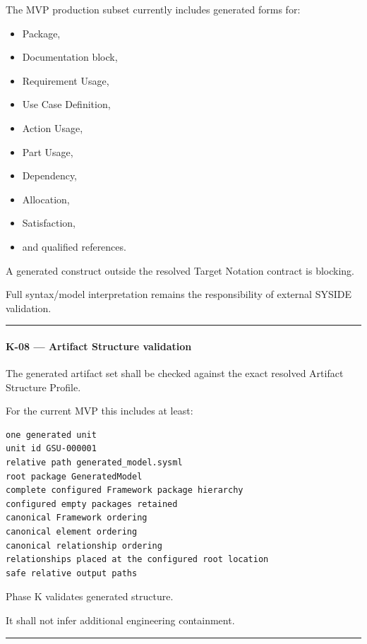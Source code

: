 The MVP production subset currently includes generated forms for:

\begin{itemize}
\tightlist
\item
  Package,
\item
  Documentation block,
\item
  Requirement Usage,
\item
  Use Case Definition,
\item
  Action Usage,
\item
  Part Usage,
\item
  Dependency,
\item
  Allocation,
\item
  Satisfaction,
\item
  and qualified references.
\end{itemize}

A generated construct outside the resolved Target Notation contract is blocking.

Full syntax/model interpretation remains the responsibility of external SYSIDE validation.

\begin{center}\rule{0.5\linewidth}{0.5pt}\end{center}

\hypertarget{k-08--artifact-structure-validation}{%
\paragraph{K-08 --- Artifact Structure validation}\label{k-08--artifact-structure-validation}}

The generated artifact set shall be checked against the exact resolved Artifact Structure Profile.

For the current MVP this includes at least:

\begin{verbatim}
one generated unit
unit id GSU-000001
relative path generated_model.sysml
root package GeneratedModel
complete configured Framework package hierarchy
configured empty packages retained
canonical Framework ordering
canonical element ordering
canonical relationship ordering
relationships placed at the configured root location
safe relative output paths
\end{verbatim}

Phase K validates generated structure.

It shall not infer additional engineering containment.

\begin{center}\rule{0.5\linewidth}{0.5pt}\end{center}

